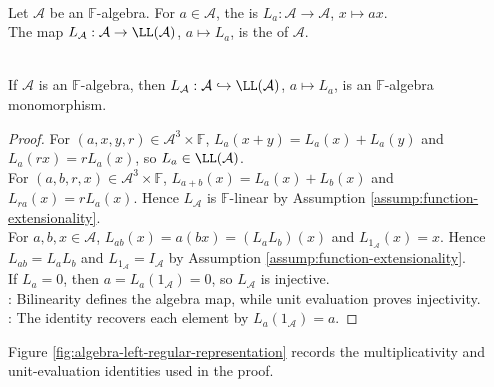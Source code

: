 \begin{definition} \label{def:left-regular-representation} \\
Let $\mathcal{A}$ be an $\mathbb{F}$-algebra. For $a\in\mathcal{A}$, the  is $L_a:\mathcal{A}\to\mathcal{A}$, $x\mapsto ax$.\\
The map $L_{\mathcal{A}}:\mathcal{A}\to\LL(\mathcal{A})$, $a\mapsto L_a$, is the  of $\mathcal{A}$.
\end{definition}

\begin{theorem} \label{thm:left-regular-representation-algebra} \\
If $\mathcal{A}$ is an $\mathbb{F}$-algebra, then $L_{\mathcal{A}}:\mathcal{A}\hookrightarrow\LL(\mathcal{A})$, $a\mapsto L_a$, is an $\mathbb{F}$-algebra monomorphism.
\begin{proof}
For $(a,x,y,r)\in\mathcal{A}^3\times\mathbb{F}$, $L_a(x+y)=L_a(x)+L_a(y)$ and $L_a(rx)=rL_a(x)$, so $L_a\in\LL(\mathcal{A})$.\\
For $(a,b,r,x)\in\mathcal{A}^3\times\mathbb{F}$, $L_{a+b}(x)=L_a(x)+L_b(x)$ and $L_{ra}(x)=rL_a(x)$. Hence $L_{\mathcal{A}}$ is $\mathbb{F}$-linear by Assumption \ref{assump:function-extensionality}.\\
For $a,b,x\in\mathcal{A}$, $L_{ab}(x)=a(bx)=(L_aL_b)(x)$ and $L_{1_{\mathcal{A}}}(x)=x$. Hence $L_{ab}=L_aL_b$ and $L_{1_{\mathcal{A}}}=I_{\mathcal{A}}$ by Assumption \ref{assump:function-extensionality}.\\
If $L_a=0$, then $a=L_a(1_{\mathcal{A}})=0$, so $L_{\mathcal{A}}$ is injective.\\
: Bilinearity defines the algebra map, while unit evaluation proves injectivity.\\
: The identity recovers each element by $L_a(1_{\mathcal{A}})=a$.
\end{proof}
\end{theorem}

Figure \ref{fig:algebra-left-regular-representation} records the multiplicativity and unit-evaluation identities used in the proof.

\begin{illustrationfigure}[H]
  \centering
  
  \caption{The left regular representation sends $a\in\mathcal{A}$ to $L_a:x\mapsto ax$; the identities $L_{ab}=L_aL_b$ and $L_a(1_{\mathcal{A}})=a$ encode multiplicativity and injectivity.}
  \label{fig:algebra-left-regular-representation}
\end{illustrationfigure}


